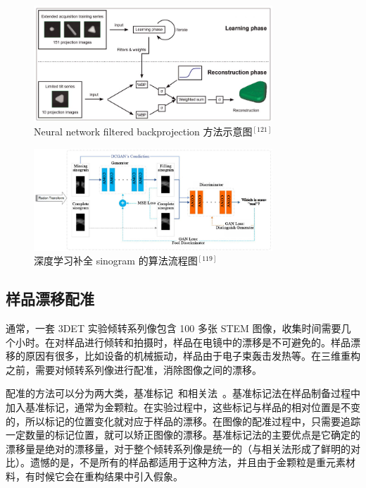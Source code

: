 \begin{figure}[H]
	\vspace{\baselineskip}
	\centering
	\includegraphics[width=0.8\textwidth]{../1.18/118}
	\caption{Neural network filtered backprojection 方法示意图$^{[121]}$}\label{fig:118}
\end{figure}

\begin{figure}[H]
	\vspace{\baselineskip}
	\centering
	\includegraphics[width=0.8\textwidth]{../1.19/119}
	\caption{深度学习补全 sinogram 的算法流程图$^{[119]}$}\label{fig:119}
\end{figure}

\subsection{样品漂移配准}
通常，一套 3DET 实验倾转系列像包含 100 多张 STEM 图像，收集时间需要几个小时。在对样品进行倾转和拍摄时，样品在电镜中的漂移是不可避免的。样品漂移的原因有很多，比如设备的机械振动，样品由于电子束轰击发热等。在三维重构之前，需要对倾转系列像进行配准，消除图像之间的漂移。

配准的方法可以分为两大类，基准标记~\cite{Ress1999,Brandt2001}和相关法~\cite{Ress1999,Jones2013}。基准标记法在样品制备过程中加入基准标记，通常为金颗粒。在实验过程中，这些标记与样品的相对位置是不变的，所以标记的位置变化就对应于样品的漂移。在图像的配准过程中，只需要追踪一定数量的标记位置，就可以矫正图像的漂移。基准标记法的主要优点是它确定的漂移量是绝对的漂移量，对于整个倾转系列像是统一的（与相关法形成了鲜明的对比）。遗憾的是，不是所有的样品都适用于这种方法，并且由于金颗粒是重元素材料，有时候它会在重构结果中引入假象。

